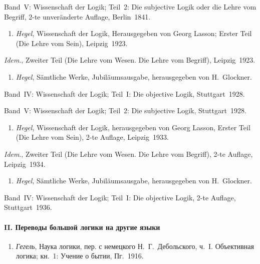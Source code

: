 Band~V: Wissen\-schaft der Logik; Teil~2: Die subjective Logik oder die Lehre
vom Begriff, 2-te unver\-änderte Auflage, Berlin~1841.

\begin{enumerate}
\item
{\em Hegel}, Wissen\-schaft der Logik, Heraus\-gegeben von Georg Lasson;
Erster Teil (Die Lehre vom Sein), Leipzig~1923.
\end{enumerate}

{\em Idem}., Zweiter Teil (Die Lehre vom Wesen. Die Lehre vom Begriff),
Leipzig~1923.

\begin{enumerate}
\item
{\em Hegel}, Sämtliche Werke, Jubiläums\-ausgabe, heraus\-gegeben von
H.~Glockner.
\end{enumerate}

Band~IV: Wissen\-schaft der Logik; Teil~I: Die objective Logik,
Stuttgart~1928.

Band~V: Wissen\-schaft der Logik; Teil~2: Die subjective Logik,
Stuttgart~1928.

\begin{enumerate}
\item
{\em Hegel}, Wissen\-schaft der Logik, heraus\-gegeben von Georg Lasson,
Erster Teil (Die Lehre vom Sein), 2-te Auflage, Leipzig~1933.
\end{enumerate}

{\em Idem}., Zweiter Teil (Die Lehre vom Wesen. Die Lehre vom Begriff),
2-te Auflage, Leipzig~1934.

\begin{enumerate}
\item
{\em Hegel}, Sämtliche Werke, Jubiläums\-ausgabe, heraus\-gegeben von
H.~Glockner.
\end{enumerate}

Band~IV: Wissen\-schaft der Logik; Teil~I: Die objective Logik, 2-te Auflage,
Stuttgart~1936.

\paragraph%
[II. Переводы большой логики на другие языки]%
{II. Переводы большой логики на другие языки}

\begin{enumerate}
\item
{\em Гегель}, Наука логики, пер. с немецкого Н.~Г.~Дебольского, ч.~I.
Объективная логика; кн.~1: Учение о бытии, Пг.~1916.
\end{enumerate}

